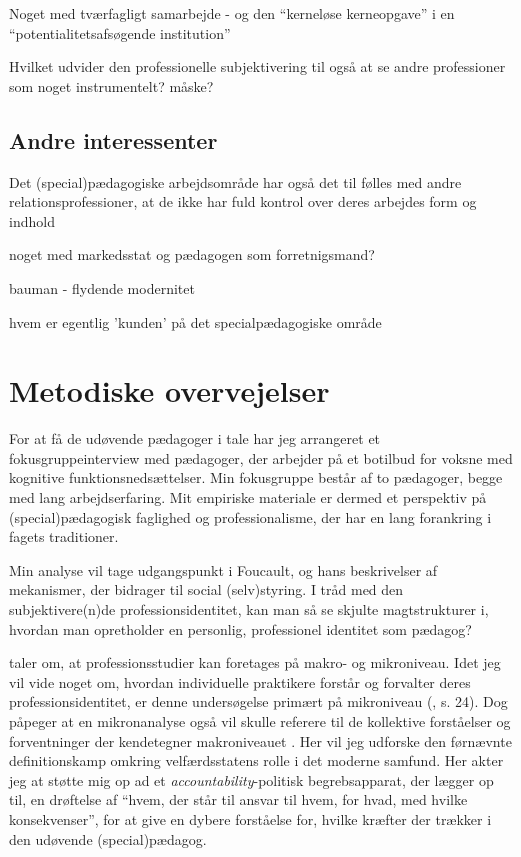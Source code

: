 Noget med tværfagligt samarbejde - og den “kerneløse kerneopgave” i en “potentialitetsafsøgende institution” \autocite{mik-meyerIndledningSkabeProfessionel2012}

Hvilket udvider den professionelle subjektivering til også at se andre professioner som noget instrumentelt? måske?

\subsection{Andre interessenter}
Det (special)pædagogiske arbejdsområde har også det til følles med andre  relationsprofessioner, at de ikke har fuld kontrol over deres arbejdes form og indhold

noget med markedsstat og pædagogen som forretnigsmand?


bauman - flydende modernitet

hvem er egentlig 'kunden' på det specialpædagogiske område

\section{Metodiske overvejelser}

For at få de udøvende pædagoger i tale har jeg arrangeret et fokusgruppeinterview med pædagoger, der arbejder på et botilbud for voksne med kognitive funktionsnedsættelser.
Min fokusgruppe består af to pædagoger, begge med lang arbejdserfaring.
Mit empiriske materiale er dermed et perspektiv på (special)pædagogisk faglighed og professionalisme, der har en lang forankring i fagets traditioner.

Min analyse vil tage udgangspunkt i Foucault, og hans beskrivelser af mekanismer, der bidrager til social (selv)styring. I tråd med den subjektivere(n)de professionsidentitet, kan man så se skjulte magtstrukturer i, hvordan man opretholder en personlig, professionel identitet som pædagog?

\citeauthor{molanderProfesjonsstudierIntroduksjon2008} taler om, at  professionsstudier kan foretages på makro- og mikroniveau.
Idet jeg vil vide noget om, hvordan individuelle praktikere forstår og forvalter deres professionsidentitet, er denne undersøgelse primært på mikroniveau (\citeyear{molanderProfesjonsstudierIntroduksjon2008}, s. 24).
Dog påpeger \citeauthor{molanderProfesjonsstudierIntroduksjon2008} at en mikronanalyse også vil skulle referere til de kollektive forståelser og forventninger der kendetegner makroniveauet \autocite[s. 24]{molanderProfesjonsstudierIntroduksjon2008}.
Her vil jeg udforske den førnævnte definitionskamp omkring velfærdsstatens rolle i det moderne samfund.
Her akter jeg at støtte mig op ad et \textit{accountability}-politisk begrebsapparat, der lægger op til, en drøftelse af “hvem, der står til ansvar til hvem, for hvad, med hvilke konsekvenser”, for at give en dybere forståelse for, hvilke kræfter der trækker i den udøvende (special)pædagog.


